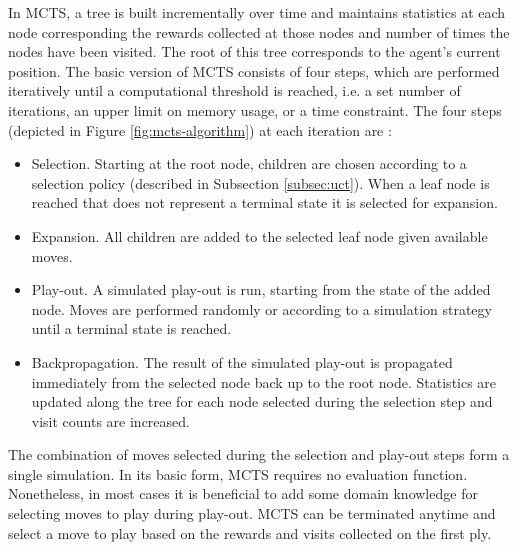 \documentclass{ecai2010}
\begin{document}
In MCTS, a tree is built incrementally over time and maintains statistics at each node corresponding the rewards collected at those nodes and number of times the nodes have been visited. The root of this tree corresponds to the agent's current position. The basic version of MCTS consists of four steps, which are performed iteratively until a computational threshold is reached, i.e. a set number of iterations, an upper limit on memory usage, or a time constraint. The four steps (depicted in Figure \ref{fig:mcts-algorithm}) at each iteration are \cite{chaslot2008progressive}:
\begin{itemize}
\item Selection. Starting at the root node, children are chosen according to a selection policy (described in Subsection \ref{subsec:uct}). When a leaf node is reached that does not represent a terminal state it is selected for expansion.
\item Expansion. All children are added to the selected leaf node given available moves.
\item Play-out. A simulated play-out is run, starting from the state of the added node. Moves are performed randomly or according to a simulation strategy until a terminal state is reached.
\item Backpropagation. The result of the simulated play-out is propagated immediately from the selected node back up to the root node. Statistics are updated along the tree for each node selected during the selection step and visit counts are increased.
\end{itemize}
The combination of moves selected during the selection and play-out steps form a single simulation. In its basic form, MCTS requires no evaluation function. Nonetheless, in most cases it is beneficial to add some domain knowledge for selecting moves to play during play-out. MCTS can be terminated anytime and select a move to play based on the rewards and visits collected on the first ply.

\end{document}
